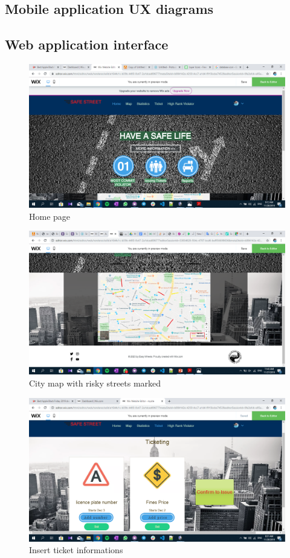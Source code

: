 \documentclass{article}
\begin{document}
	\subsection{Mobile application UX diagrams}
	\FloatBarrier
	\subsection{Web application interface}
		\label{fig:homepage}
		\begin{figure}[h]
			\includegraphics[width=\linewidth]{images/home.png}
			\caption{Home page}
		\end{figure}
		\begin{figure}[h]
			\includegraphics[width=\linewidth]{images/map.png}
			\caption{City map with risky streets marked}
		\end{figure}
		\begin{figure}[h]
			\includegraphics[width=\linewidth]{images/ticketing.png}
			\caption{Insert ticket informations}
		\end{figure}
\end{document}
